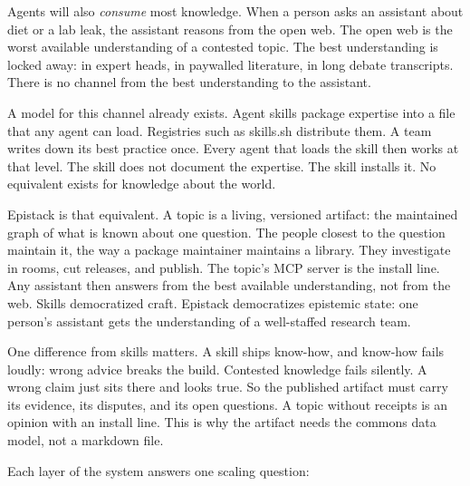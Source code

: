 \documentclass[10pt,twocolumn]{article}
\begin{document}
Agents will also \emph{consume} most knowledge. When a person asks an
assistant about diet or a lab leak, the assistant reasons from the open
web. The open web is the worst available understanding of a contested
topic. The best understanding is locked away: in expert heads, in
paywalled literature, in long debate transcripts. There is no channel
from the best understanding to the assistant.

A model for this channel already exists. Agent skills package expertise
into a file that any agent can load. Registries such as skills.sh
distribute them. A team writes down its best practice once. Every agent
that loads the skill then works at that level. The skill does not
document the expertise. The skill installs it. No equivalent exists for
knowledge about the world.

Epistack is that equivalent. A topic is a living, versioned artifact: the
maintained graph of what is known about one question. The people closest
to the question maintain it, the way a package maintainer maintains a
library. They investigate in rooms, cut releases, and publish. The
topic's MCP server is the install line. Any assistant then answers from
the best available understanding, not from the web. Skills democratized
craft. Epistack democratizes epistemic state: one person's assistant gets
the understanding of a well-staffed research team.

One difference from skills matters. A skill ships know-how, and know-how
fails loudly: wrong advice breaks the build. Contested knowledge fails
silently. A wrong claim just sits there and looks true. So the published
artifact must carry its evidence, its disputes, and its open questions.
A topic without receipts is an opinion with an install line. This is why
the artifact needs the commons data model, not a markdown file.

Each layer of the system answers one scaling question:
\end{document}
